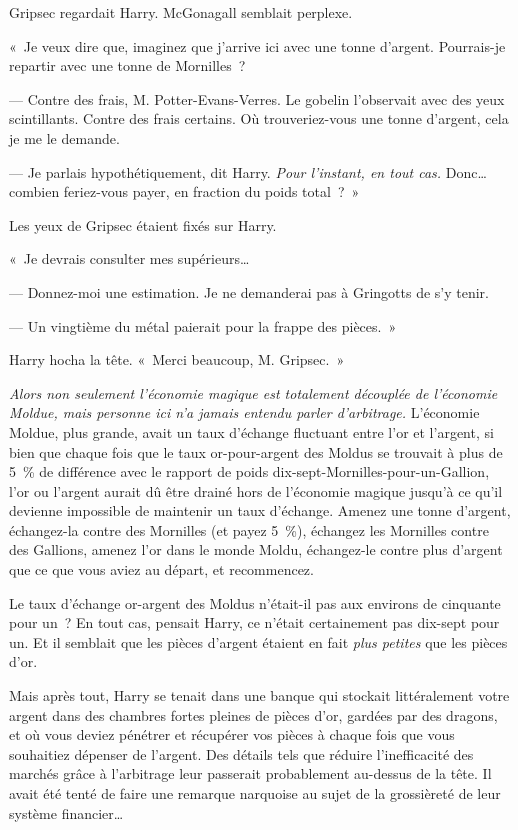 Gripsec regardait Harry. McGonagall semblait perplexe.

«~Je veux dire que, imaginez que j'arrive ici avec une tonne d'argent. Pourrais-je repartir avec une tonne de Mornilles~?

--- Contre des frais, M. Potter-Evans-Verres. Le gobelin l'observait avec des yeux scintillants. Contre des frais certains. Où trouveriez-vous une tonne d'argent, cela je me le demande.

--- Je parlais hypothétiquement, dit Harry. \emph{Pour l'instant, en tout cas.} Donc… combien feriez-vous payer, en fraction du poids total~?~»

Les yeux de Gripsec étaient fixés sur Harry.

«~Je devrais consulter mes supérieurs…

--- Donnez-moi une estimation. Je ne demanderai pas à Gringotts de s'y tenir.

--- Un vingtième du métal paierait pour la frappe des pièces.~»

Harry hocha la tête. «~Merci beaucoup, M. Gripsec.~»

\emph{Alors non seulement l'économie magique est totalement découplée de l'économie Moldue, mais personne ici n'a jamais entendu parler d'arbitrage.} L'économie Moldue, plus grande, avait un taux d'échange fluctuant entre l'or et l'argent, si bien que chaque fois que le taux or-pour-argent des Moldus se trouvait à plus de 5~\% de différence avec le rapport de poids dix-sept-Mornilles-pour-un-Gallion, l'or ou l'argent aurait dû être drainé hors de l'économie magique jusqu'à ce qu'il devienne impossible de maintenir un taux d'échange. Amenez une tonne d'argent, échangez-la contre des Mornilles (et payez 5~\%), échangez les Mornilles contre des Gallions, amenez l'or dans le monde Moldu, échangez-le contre plus d'argent que ce que vous aviez au départ, et recommencez.

Le taux d'échange or-argent des Moldus n'était-il pas aux environs de cinquante pour un~? En tout cas, pensait Harry, ce n'était certainement pas dix-sept pour un. Et il semblait que les pièces d'argent étaient en fait \emph{plus petites} que les pièces d'or.

Mais après tout, Harry se tenait dans une banque qui stockait littéralement votre argent dans des chambres fortes pleines de pièces d'or, gardées par des dragons, et où vous deviez pénétrer et récupérer vos pièces à chaque fois que vous souhaitiez dépenser de l'argent. Des détails tels que réduire l'inefficacité des marchés grâce à l'arbitrage leur passerait probablement au-dessus de la tête. Il avait été tenté de faire une remarque narquoise au sujet de la grossièreté de leur système financier…


